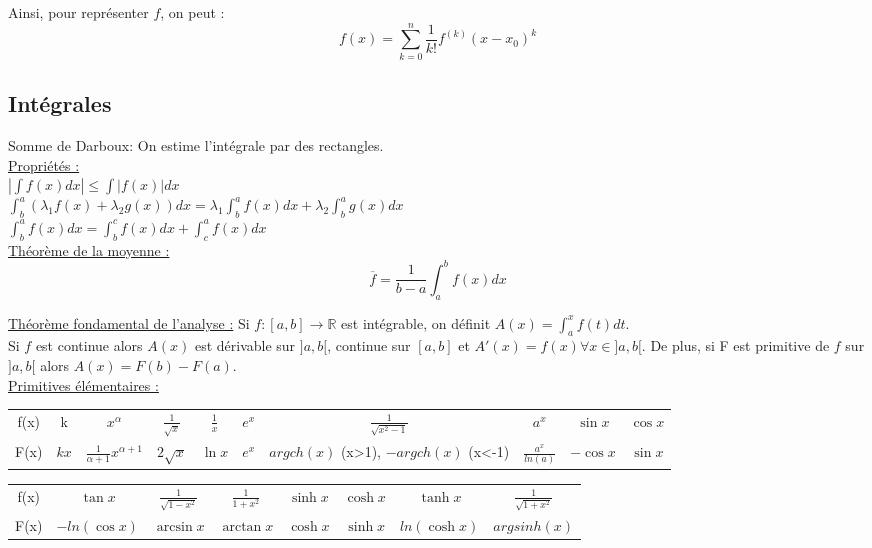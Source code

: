 \documentclass[../main.tex]{subfiles}
\begin{document}
Ainsi, pour représenter $f$, on peut : \\
\begin{equation}
    f(x) = \sum_{k=0}^n \frac{1}{k!} f^{(k)} (x-x_0)^k
\end{equation}


\subsection{Intégrales}
Somme de Darboux: On estime l'intégrale par des rectangles.\\

\underline{Propriétés :} \\$|\int f(x)dx| \leq \int |f(x)|dx$\\
$\int_b^a (\lambda_1 f(x) + \lambda_2 g(x))dx = \lambda_1 \int^a_b f(x)dx + \lambda_2  \int^a_b g(x)dx$\\
$\int_b^a f(x)dx = \int_b^c f(x)dx + \int^a_c f(x)dx$\\

\quad \underline{Théorème de la moyenne :}\\
\begin{equation}
    \overline{f} = \frac{1}{b-a} \int_a^b f(x)dx
\end{equation}

\quad \underline{Théorème fondamental de l'analyse :}
Si $f:[a,b] \rightarrow \mathbb{R}$ est intégrable, on définit $A(x) = \int_a^x f(t)dt$.\\
Si $f$ est continue alors $A(x)$ est dérivable sur $]a,b[$, continue sur $[a,b]$ et $A'(x) = f(x) \forall x \in ]a,b[$. De plus, si F est primitive de $f$ sur $]a,b[$ alors $A(x) = F(b)-F(a)$.\\

\quad \underline{Primitives élémentaires :}
\begin{table}[hbt!]
    \centering
    \begin{tabular}{c|c|c|c|c|c|c|c|c|c}
        f(x) & k & $x^{\alpha}$ & $\frac{1}{\sqrt{x}}$ & $\frac{1}{x}$ &$e^x$ & $\frac{1}{\sqrt{x^2-1}}$ & $a^x$ & $\sin x$& $\cos x$\\
        F(x) & $kx$ & $\frac{1}{\alpha + 1}x^{\alpha +1}$ & $2\sqrt{x}$ & $\ln{x}$ & $e^x$ & $argch(x)$ (x>1), $-argch(x)$ (x<-1) & $\frac{a^x}{ln(a)}$ & $-\cos x$ &$\sin x$\\
    \end{tabular}
    
\end{table}
\begin{table}[hbt!]
    \centering
    \begin{tabular}{c|c|c|c|c|c|c|c}
        f(x) & $\tan x$ & $\frac{1}{\sqrt{1-x^2}}$ & $\frac{1}{1+x^2}$ & $\sinh x$ & $\cosh x$ & $\tanh x$ & $\frac{1}{\sqrt{1+x^2}}$\\
        F(x) & $-ln(\cos x)$ & $\arcsin x$ & $\arctan x$ & $\cosh x$ & $\sinh x$ & $ln(\cosh x)$ & $argsinh(x)$\\
    \end{tabular}
    
\end{table}
\end{document}
